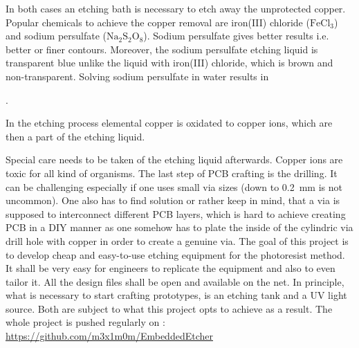 In both cases an etching bath is necessary to etch away the unprotected copper. Popular chemicals to achieve the copper removal are iron(III) chloride ($\text{FeCl}_3$) and sodium persulfate ($\text{Na}_2\text{S}_2\text{O}_8$).
\newpar
Sodium persulfate gives better results i.e. better or finer contours. Moreover, the sodium persulfate etching liquid is transparent blue unlike the liquid with iron(III) chloride, which is brown and non-transparent. Solving sodium persulfate in water results in
\begin{center}
	.
\end{center}
In the etching process elemental copper is oxidated to copper ions, which are then a part of the etching liquid. 
\begin{center}
\end{center}
Special care needs to be taken of the etching liquid afterwards. Copper ions are toxic for all kind of organisms. The last step of \gls{PCB} crafting is the drilling. It can be challenging especially if one uses small via sizes (down to \SI{0.2}{\milli\metre} is not uncommon). One also has to find solution or rather keep in mind, that a via is supposed to interconnect different \gls{PCB} layers, which is hard to achieve creating \gls{PCB} in a \gls{DIY} manner as one somehow has to plate the inside of the cylindric via drill hole with copper in order to create a genuine via.   
\newpar 
The goal of this project is to develop cheap and easy-to-use etching equipment for the photoresist method. It shall be very easy for engineers to replicate the equipment and also to even tailor it. All the design files shall be open and available on the net. 
\newpar
In principle, what is necessary to start crafting prototypes, is an etching tank and a \gls{UV} light source. Both are subject to what this project opts to achieve as a result.   
\newpar 
The whole project is pushed regularly on : \href{https://github.com/m3x1m0m/EmbeddedEtcher}{https://github.com/m3x1m0m/EmbeddedEtcher}